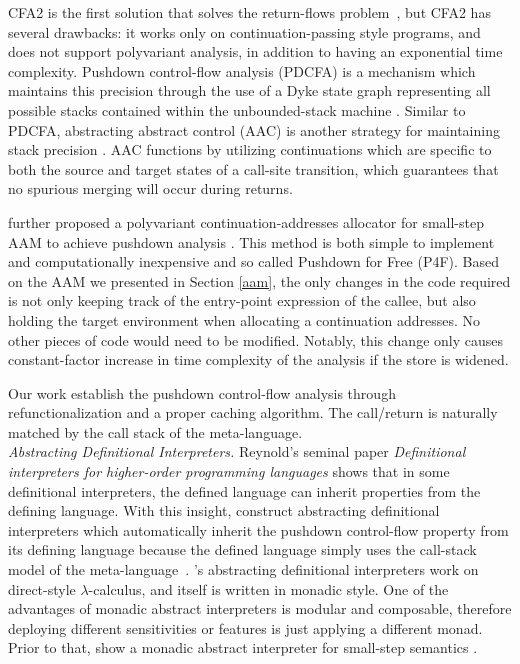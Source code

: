 \documentclass[acmsmall, review]{acmart}\settopmatter{}
\begin{document}
CFA2 is the first solution that solves the return-flows problem~\cite{vardoulakis2010cfa2},
but CFA2 has several drawbacks: it works only on continuation-passing style programs, and
does not support polyvariant analysis, in addition to having an exponential time complexity.
Pushdown control-flow analysis (PDCFA) is a mechanism which maintains this precision through
the use of a Dyke state graph representing all possible stacks contained within the unbounded-stack
machine \cite{earl2012introspective, earl2010pushdown}. Similar to PDCFA, abstracting abstract
control (AAC) is another strategy for maintaining stack precision \cite{johnson2015abstracting}.
AAC functions by utilizing continuations which are specific to both the source and target states
of a call-site transition, which guarantees that no spurious merging will occur during returns.

\citeauthor{gilray2016pushdown} further proposed a polyvariant continuation-addresses allocator
for small-step AAM to achieve pushdown analysis \cite{gilray2016pushdown}. This method is both
simple to implement and computationally inexpensive and so called Pushdown for Free (P4F).
Based on the AAM we presented in Section \ref{aam}, the only changes in the code required is not
only keeping track of the entry-point expression of the callee, but also holding the target
environment when allocating a continuation addresses. No other pieces of code would need to be
modified. Notably, this change only causes constant-factor increase in time complexity of
the analysis if the store is widened.

Our work establish the pushdown control-flow analysis through refunctionalization and a
proper caching algorithm. The call/return is naturally matched by the call stack of the
meta-language. \\

\textit{Abstracting Definitional Interpreters.}
Reynold's seminal paper \emph{Definitional interpreters for higher-order programming languages} 
\cite{Reynolds:72, Reynolds:HOSC98-revisited} shows that in some definitional interpreters, the
defined language can inherit properties from the defining language. With this insight,
\citeauthor{darais2017abstracting} construct abstracting definitional interpreters which
automatically inherit the pushdown control-flow property from its defining language because
the defined language simply uses the call-stack model of the meta-language~\cite{darais2017abstracting}.
\citeauthor{darais2017abstracting}'s abstracting definitional interpreters work on direct-style
$\lambda$-calculus, and itself is written in monadic style. One of the advantages of monadic
abstract interpreters is modular and composable, therefore deploying different sensitivities
or features is just applying a different monad. Prior to that, \citeauthor{Sergey:2013:MAI:2491956.2491979}
show a monadic abstract interpreter for small-step semantics \cite{Sergey:2013:MAI:2491956.2491979}.
\end{document}
